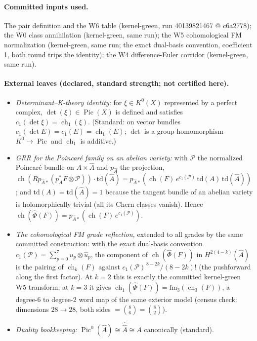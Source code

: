 \documentclass[11pt]{article}
\newcommand{\ch}{\operatorname{ch}}
\newcommand{\Pic}{\operatorname{Pic}}
\newcommand{\KA}{A}
\newcommand{\KAd}{\widehat{A}}
\begin{document}
\paragraph{Committed inputs used.} The pair definition and the W6 table
(kernel-green, run 40139821467 @ c6a2778); the W0 class annihilation
(kernel-green, same run); the W5 cohomological FM normalization
(kernel-green, same run; the exact dual-basis convention, coefficient 1,
both round trips the identity); the W4 difference-Euler corridor
(kernel-green, same run).

\paragraph{External leaves (declared, standard strength; not certified
here).}
\begin{itemize}
\item[P1] \emph{Determinant--K-theory identity:} for $\xi \in K^0(X)$
represented by a perfect complex, $\det(\xi) \in \Pic(X)$ is defined and
satisfies $c_1(\det \xi) = \ch_1(\xi)$. (Standard: on vector bundles
$c_1(\det E) = c_1(E) = \ch_1(E)$; $\det$ is a group homomorphism
$K^0 \to \Pic$ and $\ch_1$ is additive.)
\item[P2] \emph{GRR for the Poincar\'e family on an abelian variety:}
with $\mathcal{P}$ the normalized Poincar\'e bundle on $\KA\times\KAd$ and
$p_{\KAd}$ the projection,
$\ch(Rp_{\KAd *}(p_\KA^*F\otimes \mathcal{P}))\cdot \mathrm{td}(\KAd)
= p_{\KAd *}(\ch(F)\, e^{c_1(\mathcal{P})}\,\mathrm{td}(\KA)\,
\mathrm{td}(\KAd))$; and $\mathrm{td}(\KA) = \mathrm{td}(\KAd) = 1$
because the tangent bundle of an abelian variety is holomorphically
trivial (all its Chern classes vanish). Hence
$\ch(\widehat{\Phi}(F)) = p_{\KAd *}(\ch(F)\, e^{c_1(\mathcal{P})})$.
\item[P3] \emph{The cohomological FM grade reflection,} extended to all
grades by the same committed construction: with the exact dual-basis
convention $c_1(\mathcal{P}) = \sum_{p=0}^{7} u_p \otimes \widehat u_p$,
the component of $\ch(\widehat\Phi(F))$ in $H^{2(4-k)}(\KAd)$ is the
pairing of $\ch_k(F)$ against $c_1(\mathcal{P})^{\,8-2k}/(8-2k)!$
(the pushforward along the first factor). At $k=2$ this is exactly the
committed kernel-green W5 transform; at $k=3$ it gives
$\ch_1(\widehat\Phi(F)) = \mathrm{fm}_3(\ch_3(F))$, a degree-6 to
degree-2 word map of the same exterior model (census check: dimensions
$28 \to 28$, both sides $=\binom{8}{6}=\binom{8}{2}$).
\item[P4] \emph{Duality bookkeeping:} $\Pic^0(\KAd) \cong
\widehat{\widehat{A}} \cong \KA$ canonically (standard).
\end{itemize}
\end{document}
